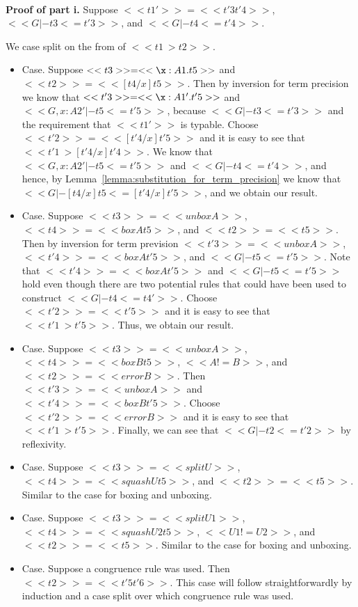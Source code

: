 \begin{itemize}
  \ \\
  \noindent
  \textbf{Proof of part i.}  Suppose $<<t1'>> = <<t'3 t'4>>$, $<<G |- t3 <= t'3>>$, and $<<G |- t4 <= t'4>>$.

  We case split on the from of $<<t1 ~> t2>>$.
  \begin{itemize}
  \item[] Case.  Suppose $<<t3>> = <<\x:A1.t5>>$ and $<<t2>> = << [t4/x]t5>>$.
    Then by inversion for term precision we know that
    $<<t'3>> = <<\x:A1'.t'5>>$ and $<<G, x : A2' |- t5 <= t'5>>$,
    because $<<G |- t3 <= t'3>>$ and the requirement that $<<t1'>>$ is typable. Choose $<<t'2>> = << [t'4/x]t'5>>$
    and it is easy to see that $<<t'1 ~> [t'4/x]t'4>>$.
    We know that $<<G, x : A2' |- t5 <= t'5>>$ and $<<G |- t4 <= t'4>>$, and hence,
    by Lemma~\ref{lemma:substitution_for_term_precision} we know that
    $<<G |- [t4/x]t5 <= [t'4/x]t'5>>$, and we obtain our result.
    
  \item[] Case.  Suppose $<<t3>> = <<unbox A>>$, $<<t4>> = <<box A t5>>$, and $<<t2>> = <<t5>>$.
    Then by inversion for term prevision $<<t'3>> = <<unbox A>>$, $<<t'4>> = <<box A t'5>>$, and $<<G |- t5 <= t'5>>$.
    Note that $<<t'4>> = <<box A t'5>>$ and $<<G |- t5 <= t'5>>$ hold even though there are two potential rules
    that could have been used to construct $<<G |- t4 <= t4'>>$. 
    Choose $<<t'2>> = <<t'5>>$ and it is easy to see that $<<t'1 ~> t'5>>$.  Thus, we obtain our result.    

  \item[] Case.  Suppose $<<t3>> = <<unbox A>>$, $<<t4>> = <<box B t5>>$, $<<A != B>>$,
    and $<<t2>> = <<error B>>$.  Then $<<t'3>> = <<unbox A>>$ and $<<t'4>> = <<box B t'5>>$.
    Choose $<<t'2>> = <<error B>>$ and it is easy to see that $<<t'1 ~> t'5>>$.  Finally,
    we can see that $<<G |- t2 <= t'2>>$ by reflexivity.
    
  \item[] Case.  Suppose $<<t3>> = <<split U>>$, $<<t4>> = <<squash U t5>>$, and $<<t2>> = <<t5>>$.
    Similar to the case for boxing and unboxing.
    
  \item[] Case.  Suppose $<<t3>> = <<split U1>>$, $<<t4>> = <<squash U2 t5>>$, $<<U1 != U2>>$, and $<<t2>> = <<t5>>$.
    Similar to the case for boxing and unboxing.

  \item[] Case. Suppose a congruence rule was used.  Then $<<t2>> = <<t'5 t'6>>$.
    This case will follow straightforwardly by induction and a case split over which congruence rule was used.
  \end{itemize}


\end{itemize}
